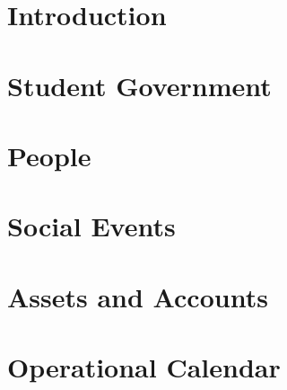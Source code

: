 


\chapter{Introduction}\label{intro}


\chapter{Student Government}\label{government}


\chapter{People}\label{people}


\chapter{Social Events}\label{events}


\chapter{Assets and Accounts}\label{events}


\chapter{Operational Calendar}\label{opcal}
















